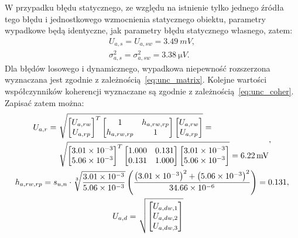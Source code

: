 W przypadku błędu statycznego, ze względu na istnienie tylko jednego źródła tego błędu i jednostkowego wzmocnienia statycznego obiektu, parametry wypadkowe będą identyczne, jak parametry błędu statycznego własnego, zatem:
\begin{gather}
U_{a,s} = U_{a,sw} = \qty{3.49}{mV} \label{eq:sym_parta_uncert_stat}, \\
\sigma_{a,s}^{2} = \sigma_{a,sw}^{2} = \qty{3.38}{\micro V} \label{eq:sym_parta_var_stat}.
\end{gather}
Dla błędów losowego i dynamicznego, wypadkowa niepewność rozszerzona wyznaczana jest zgodnie z zależnością~\eqref{eq:unc_matrix}. Kolejne wartości współczynników koherencji wyznaczane są zgodnie z zależnością~\eqref{eq:unc_coher}. Zapisać zatem można:
\begin{gather}
\begin{split}
U_{a,r} =~
& \sqrt{
\begin{bmatrix}
U_{a,rw} \\ U_{a,rp}
\end{bmatrix}^{T}
\begin{bmatrix}
1           & h_{a,rw,rp} \\
h_{a,rw,rp} & 1
\end{bmatrix}
\begin{bmatrix}
U_{a,rw} \\ U_{a,rp}
\end{bmatrix}} =~\\
& \sqrt{
\begin{bmatrix}
\num{3.01e-3} \\ \num{5.06e-3}
\end{bmatrix}^{T}
\begin{bmatrix}
1.000 & 0.131 \\
0.131 & 1.000
\end{bmatrix}
\begin{bmatrix}
\num{3.01e-3} \\ \num{5.06e-3}
\end{bmatrix}} = \qty{6.22}{mV}
\end{split}
\label{eq:sym_parta_uncert_rand}, \\
h_{a,rw,rp} = s_{u,n} \cdot \sqrt[3]{\frac{\num{3.01e-3}}{\num{5.06e-3}}} \left( \frac{\left(\num{3.01e-3}\right)^{2} + \left(\num{5.06e-3}\right)^{2}}{\num{34.66e-6}} \right) = 0.131 \label{eq:sym_parta_coher_rw_rp}, \\
\begin{split}
U_{a,d} =~
& \sqrt{
\begin{bmatrix}
U_{a,dw,1} \\ U_{a,dw,2} \\ U_{a,dw,3}

\end{bmatrix}}
\end{split}
\end{gather}
